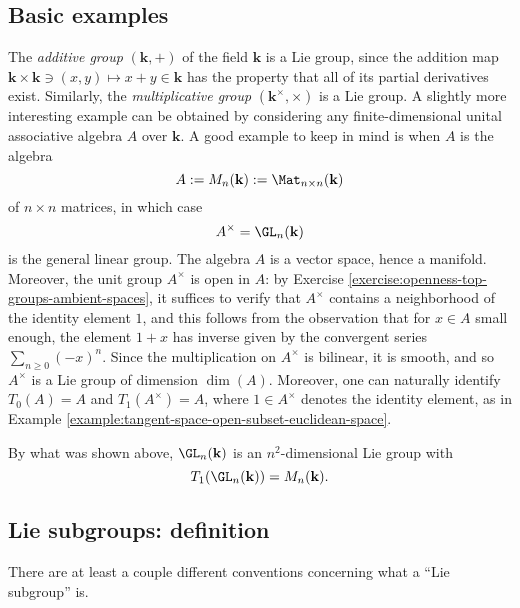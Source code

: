 \documentclass[reqno]{amsart} 
\begin{document}
\subsection{Basic examples}
\label{sec:org7a9cd32}
The \emph{additive group} $(\mathbf{k},+)$
of the field $\mathbf{k}$ is a Lie group,
since the addition map $\mathbf{k} \times \mathbf{k}
\ni (x,y) \mapsto x + y \in \mathbf{k}$ has the property
that all of its partial derivatives exist.
Similarly, the \emph{multiplicative group}
$(\mathbf{k}^\times,\times)$ is a Lie group.
A slightly more interesting example
can be obtained by considering
any finite-dimensional unital associative algebra $A$ over
$\mathbf{k}$.
A good example to keep in mind is when $A$ is the algebra
\begin{equation*}
A := M_n(\mathbf{k})
:=
\Mat_{n \times n}(\mathbf{k})
\end{equation*}
of $n \times n$ matrices,
in which case
\begin{equation*}
A^\times = \GL_n(\mathbf{k})
\end{equation*}
is the general linear group.
The algebra $A$ is a vector space, hence a manifold.
Moreover, the unit group $A^\times$ is open
in $A$: by Exercise \ref{exercise:openness-top-groups-ambient-spaces},
it suffices to verify that $A^\times$ contains
a neighborhood of the identity element $1$,
and this follows from the observation
that for $x \in A$ small enough,
the element $1 + x$
has inverse given by the convergent series $\sum_{n \geq 0}
(-x)^n$.
Since the multiplication on $A^\times$ is bilinear, it is smooth,
and so $A^\times$ is a Lie group of dimension $\dim(A)$.
Moreover, one can naturally identify
$T_0(A) = A$ and
$T_1(A^\times) = A$, where $1 \in A^\times$ denotes the identity element, as in 
Example \ref{example:tangent-space-open-subset-euclidean-space}.

By what was shown above, $\GL_n(\mathbf{k})$ is an
$n^2$-dimensional Lie group
with
\begin{equation}\label{eq:lie-algebra-general-linear-group}
  T_1(\GL_n(\mathbf{k})) = M_n(\mathbf{k}).
\end{equation}

\subsection{Lie subgroups: definition}
\label{sec:orgc7b7f1f}
There are at least a couple different
conventions concerning what a ``Lie subgroup'' is.
\end{document}
